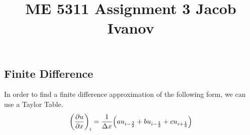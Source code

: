\documentclass[10pt, reqno]{amsart}
\begin{document}
\title{ME 5311 \quad Assignment 3 \quad Jacob Ivanov}

\maketitle
\begin{multicols}{2}
    \section{Finite Difference}
    In order to find a finite difference approximation of the following form, we can use a Taylor Table. 
    \begin{equation}
        \left( \pdv{u}{x} \right)_i = \frac{1}{\Delta x} \Big( a u_{i - \frac{3}{2}} + b u_{i - \frac{1}{2}} + c u_{i + \frac{1}{2}} \Big)
    \end{equation}
    

\end{multicols}
\end{document}
